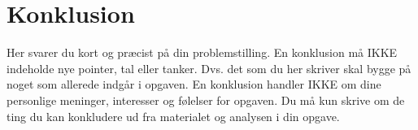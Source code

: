\section{Konklusion}
Her svarer du kort og præcist på din problemstilling. En konklusion må IKKE
indeholde nye pointer, tal eller tanker. Dvs. det som du her skriver skal bygge
på noget som allerede indgår i opgaven. En konklusion handler IKKE om dine
personlige meninger, interesser og følelser for opgaven. Du må kun skrive om de
ting du kan konkludere ud fra materialet og analysen i din opgave.
